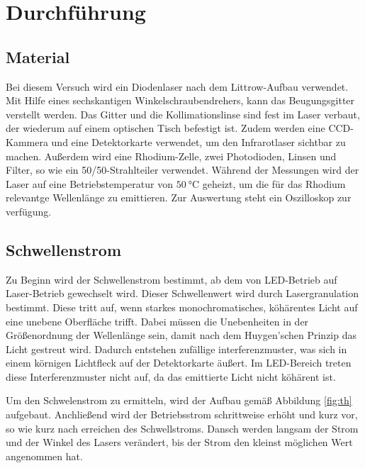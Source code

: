 
\section{Durchführung}
\label{sec:Durchführung}

\subsection{Material}
Bei diesem Versuch wird ein Diodenlaser nach dem Littrow-Aufbau verwendet. 
Mit Hilfe eines sechskantigen Winkelschraubendrehers, kann das Beugungsgitter verstellt werden.
Das Gitter und die Kollimationslinse sind fest im Laser verbaut, der wiederum auf einem optischen Tisch befestigt ist.
Zudem werden eine CCD-Kammera und eine Detektorkarte verwendet, um den Infrarotlaser sichtbar zu machen.
Außerdem wird eine Rhodium-Zelle, zwei Photodioden, Linsen und Filter, so wie ein 50/50-Strahlteiler verwendet.
Während der Messungen wird der Laser auf eine Betriebstemperatur von $\SI{50}{\celsius}$ geheizt, um die für das Rhodium relevantge Wellenlänge zu emittieren.
Zur Auswertung steht ein Oszilloskop zur verfügung.



\subsection{Schwellenstrom}
\label{sec:schwellenstrom}

Zu Beginn wird der Schwellenstrom bestimmt, ab dem von LED-Betrieb auf Laser-Betrieb gewechselt wird.
Dieser Schwellenwert wird durch Lasergranulation bestimmt.
Diese tritt auf, wenn starkes monochromatisches, köhärentes Licht auf eine unebene Oberfläche trifft.
Dabei müssen die Unebenheiten in der Größenordnung der Wellenlänge sein, damit nach dem Huygen'schen Prinzip das Licht gestreut wird.
Dadurch entstehen zufällige interferenzmuster, was sich in einem körnigen Lichtfleck auf der Detektorkarte äußert.
Im LED-Bereich treten diese Interferenzmuster nicht auf, da das emittierte Licht nicht köhärent ist.

Um den Schwelenstrom zu ermitteln, wird der Aufbau gemäß Abbildung \ref{fig:th} aufgebaut.
Anchließend wird der Betriebsstrom schrittweise erhöht und kurz vor, so wie kurz nach erreichen des Schwellstroms.
Dansch werden langsam der Strom und der Winkel des Lasers verändert, bis der Strom den kleinst möglichen Wert angenommen hat.

